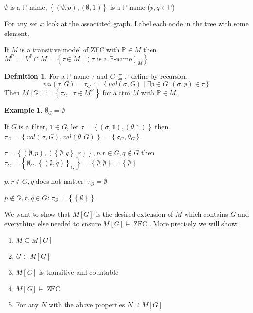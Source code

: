 \documentclass{scrartcl}
\newcommand{\set}[1]{\left\{#1\right\}}
\DeclareMathOperator{\ZFC}{ZFC}
\theoremstyle{definition}
\newtheorem*{definition*}{Definition}
\newtheorem*{example*}{Example}
\theoremstyle{plain}
\theoremstyle{remark}
\begin{document}
 	$\emptyset$ is a $\mathbb{P}$-name, $\set{(\emptyset, p), (\emptyset, 1)}$ is a $\mathbb{P}$-name ($p, q \in \mathbb{P}$)
 	
 	For any set $x$ look at the associated graph. Label each node in the tree with some element.
 	
 	If $M$ is a transitive model of ZFC with $\mathbb{P} \in M$ then $M^\mathbb{P} := V^\mathbb{P} \cap M = \set{\tau \in M \mid (\tau \text{ is a } \mathbb{P}\text{-name})_M }$
 	
 	\begin{definition*}
 		For a $\mathbb{P}$-name $\tau$ and $G \subseteq \mathbb{P}$ define by recursion 
 		\[val(\tau, G) = \tau_G := \set{val(\sigma, G) \mid \exists p \in G: (\sigma, p) \in \tau}\]
 		Then $M[G] := \set{\tau_G \mid \tau \in M^\mathbb{P}}$ for a ctm $M$ with $\mathbb{P} \in M$.
 	\end{definition*}
 
 	\begin{example*}
 		$\emptyset_G = \emptyset$
 		
 		If $G$ is a filter, $\mathbb{1} \in G$, let $\tau = \set{(\sigma, \mathbb{1}), (\theta, \mathbb{1})}$ then
 		$\tau_G = \set{val(\sigma, G), val(\theta, G)} = \set{\sigma_G, \theta_G}$.
 		
 		$\tau = \set{(\emptyset, p), (\set{\emptyset, q}, r)}, p,r \in G, q \notin G $ then $\tau_G = \set{\emptyset_G, \set{(\emptyset,q)}_G} = \set{\emptyset, \emptyset} = \set{\emptyset}$
 		
 		$p, r \notin G, q$ does not matter: $\tau_G = \emptyset$
 		
 		$p\notin G, r,q\in G$: $\tau_G= \set{\set{\emptyset}}$
 	\end{example*}

	We want to show that $M[G]$ is the desired extension of $M$ which contains $G$ and
	everything else needed to ensure $M[G] \vDash \ZFC$. More precisely we will show:
	\begin{enumerate}[(1)]
		\item $M \subseteq M[G]$

		\item $G \in M[G]$

		\item $M[G]$ is transitive and countable

		\item $M[G] \vDash \ZFC$

		\item For any $N$ with the above properties $N \supseteq M[G]$
	\end{enumerate}
\end{document}
